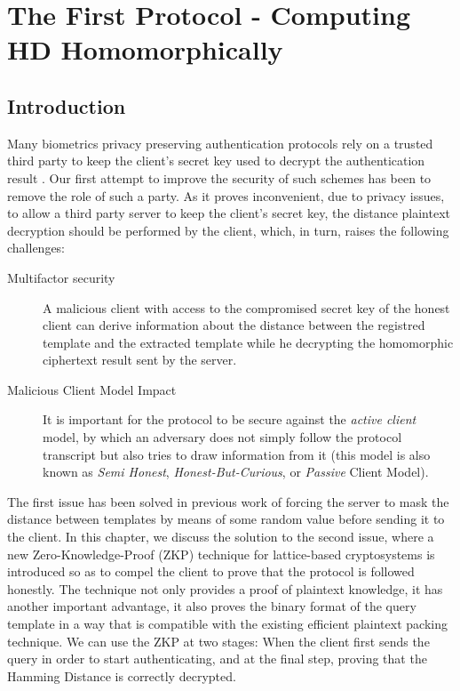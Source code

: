 \chapter{The First Protocol - Computing HD Homomorphically}
\label{chap:firstProtocol}

\ifpdf
    \graphicspath{{Chapter3/Figs/Raster/}{Chapter3/Figs/PDF/}{Chapter3/Figs/}}
\else
    \graphicspath{{Chapter3/Figs/Vector/}{Chapter3/Figs/}}
\fi

\section{Introduction}
\label{sec:firstProcIntro}
Many biometrics privacy preserving authentication protocols rely on a trusted
third party to keep the client's secret key used to decrypt the authentication
result \cite{mandal2015comprehensive, hirano2013cryptographically, upmanyu2010blind}. Our first attempt to improve the security of such schemes has
been to remove the role of such a party. As it proves inconvenient, due to
privacy issues, to allow a third party server to keep the client's secret key, the
distance plaintext decryption should be performed by the client, which, in turn,
raises the following challenges:
\begin{description}
\item[Multifactor security] A malicious client with access to the compromised
  secret key of the honest client can derive information about the distance
  between the registred template and the extracted template while he decrypting
  the homomorphic ciphertext result sent by the server.
\item[Malicious Client Model Impact] It is important for the protocol to be secure
  against the \textit{active client }model, by which an adversary does not simply follow the
  protocol transcript but also tries to draw information from it (this model is also known
  as \textit{Semi Honest}, \textit{Honest-But-Curious}, or \textit{Passive} Client Model). 
\end{description}

The first issue has been solved in previous work of
\cite{mandal2015comprehensive} forcing the server to mask the distance between
templates by means of some random value before sending it to the client. In this
chapter, we discuss the solution to the second issue, where a new
Zero-Knowledge-Proof (ZKP) technique for lattice-based cryptosystems is
introduced so as to compel the client to prove that the protocol is followed
honestly. The technique not only provides a proof of plaintext knowledge, it has
another important advantage, it also proves the binary format of the query
template in a way that is compatible with the existing efficient plaintext
packing technique. We can use the ZKP at two stages: When the
client first sends the query in order to start authenticating, and at the final
step, proving that the Hamming Distance is correctly decrypted.


